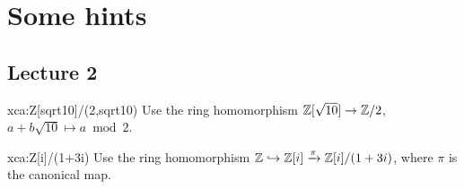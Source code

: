 \chapter{Some hints}


\section*{Lecture 2}

\begin{sol}{xca:Z[sqrt10]/(2,sqrt10)}
	Use the ring homomorphism $\mathbb{Z}[\sqrt{10}]\to\mathbb{Z}/2$, $a+b\sqrt{10}\mapsto a\bmod 2$. 	
\end{sol}

\begin{sol}{xca:Z[i]/(1+3i)}
	Use the ring homomorphism $\mathbb{Z}\hookrightarrow\mathbb{Z}[i]\xrightarrow{\pi}\mathbb{Z}[i]/(1+3i)$, where
	$\pi$ is the canonical map. 	
\end{sol}


